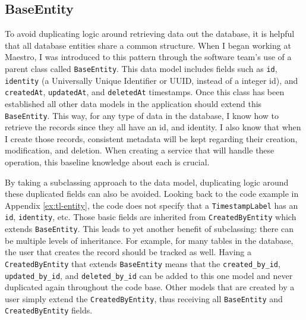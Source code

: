 \subsection{BaseEntity}

To avoid duplicating logic around retrieving data out the database, it is helpful that all database entities share a common structure.  When I began working at Maestro, I was introduced to this pattern through the software team's use of a parent class called \verb!BaseEntity!.  This data model includes fields such as \verb!id!, \verb!identity! (a Universally Unique Identifier or UUID, instead of a integer id), and \verb!createdAt!, \verb!updatedAt!, and \verb!deletedAt! timestamps.  Once this class has been established all other data models in the application should extend this \verb!BaseEntity!.  This way, for any type of data in the database, I know how to retrieve the records since they all have an id, and identity. I also know that when I create those records, consistent metadata will be kept regarding their creation, modification, and deletion. When creating a service that will handle these operation, this baseline knowledge about each is crucial.

By taking a subclassing approach to the data model, duplicating logic around these duplicated fields can also be avoided.  Looking back to the code example in Appendix \ref{ex:tl-entity}, the code does not specify that a \verb!TimestampLabel! has an \verb!id!, \verb!identity!, etc. Those basic fields are inherited from \verb!CreatedByEntity! which extends \verb!BaseEntity!.  This leads to yet another benefit of subclassing: there can be multiple levels of inheritance. For example, for many tables in the database, the user that creates the record should be tracked as well.  Having a \verb!CreatedByEntity! that extends \verb!BaseEntity! means that the \verb!created_by_id!, \verb!updated_by_id!, and \verb!deleted_by_id! can be added to this one model and never duplicated again throughout the code base.  Other models that are created by a user simply extend the \verb!CreatedByEntity!, thus receiving all \verb!BaseEntity! and \verb!CreatedByEntity! fields.